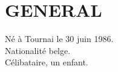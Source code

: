 \section{GENERAL}

\vspace{0.50cm}

Né à Tournai le 30 juin 1986.\\
Nationalité belge.\\
Célibataire, un enfant.
